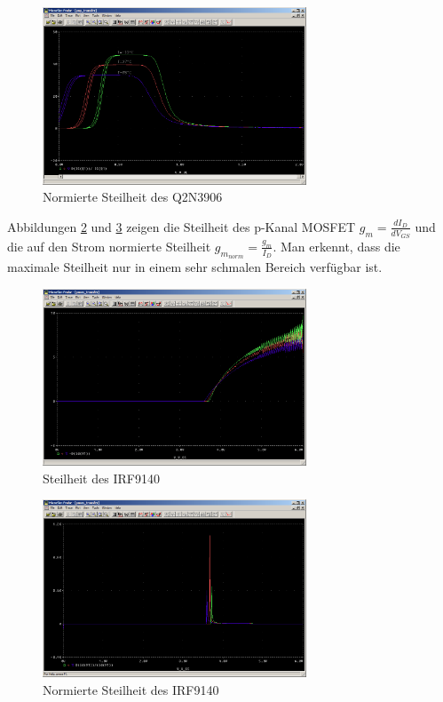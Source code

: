 \begin{figure}[h!]
	\centering
	\includegraphics[width=0.70\textwidth]{fig/ue2_ex3_pnp_s_norm.PNG}
	\caption{Normierte Steilheit des Q2N3906}
	\label{fig:3_pnp_s_norm}
\end{figure}

Abbildungen \ref{fig:3_pmos_s} und \ref{fig:3_pmos_s_norm} zeigen die Steilheit des p-Kanal MOSFET $g_m = \frac{dI_D}{dV_{GS}}$ und die auf den Strom normierte Steilheit $g_m_{norm} = \frac{g_m}{I_D}$. Man erkennt, dass die maximale Steilheit nur in einem sehr schmalen Bereich verfügbar ist.

\begin{figure}[h!]
	\centering
	\includegraphics[width=0.70\textwidth]{fig/ue2_ex3_pmos_s.PNG}
	\caption{Steilheit des IRF9140}
	\label{fig:3_pmos_s}
\end{figure}

\begin{figure}[h!]
	\centering
	\includegraphics[width=0.70\textwidth]{fig/ue2_ex3_pmos_s_norm.PNG}
	\caption{Normierte Steilheit des IRF9140}
	\label{fig:3_pmos_s_norm}
\end{figure}

